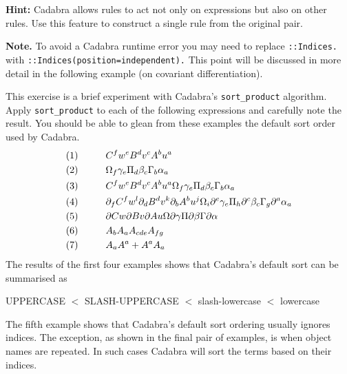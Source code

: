 \documentclass[a4paper,12pt]{article}
\numberwithin{equation}{section}%
\begin{document}
\begin{Exercises}
\begin{Exercise}
      {\bf Hint:} Cadabra allows rules to act not only on expressions but also on other
      rules. Use this feature to construct a single rule from the original pair.

      {\bf Note.} To avoid a Cadabra runtime error you may need to replace \verb|::Indices.|
      with \verb|::Indices(position=independent).| This point will be discussed in more
      detail in the following example (on covariant differentiation).
   \end{Exercise}

   \begin{Exercise}
      This exercise is a brief experiment with Cadabra's \verb|sort_product| algorithm.
      Apply \verb|sort_product| to each of the following expressions and carefully note the
      result. You should be able to glean from these examples the default sort order used by
      Cadabra.
      \begin{align*}
         (1)\hskip 1cm & C^{f} w^{e} B^{d} v^{c} A^{b} u^{a}\\
         (2)\hskip 1cm & \Omega_{f} \gamma_{e} \Pi_{d} \beta_{c} \Gamma_{b} \alpha_{a}\\
         (3)\hskip 1cm & C^{f} w^{e} B^{d} v^{c} A^{b} u^{a} \Omega_{f}
                         \gamma_{e} \Pi_{d} \beta_{c}
                         \Gamma_{b} \alpha_{a}\\
         (4)\hskip 1cm & \partial_{f}{C^{f}} w^{l}
                         \partial_{d}{B^{d}} v^{k} \partial_{b}{A^{b}} u^{j}
                         \Omega_{i} \partial^{e}{\gamma_{e}} \Pi_{h} \partial^{c}{\beta_{c}}
                         \Gamma_{g} \partial^{a}{\alpha_{a}}\\
         (5)\hskip 1cm & \partial{C} w \partial{B} v \partial{A} u \Omega
                         \partial{\gamma} \Pi
                         \partial{\beta} \Gamma \partial{\alpha}\\
         (6)\hskip 1cm & A_{b} A_{a} A_{c d e} A_{f g}\\
         (7)\hskip 1cm & A_{a} A^{a}+A^{a} A_{a}
      \end{align*}
      The results of the first four examples shows that Cadabra's default sort can be
      summarised as
      \begin{center}
         UPPERCASE $<$ SLASH-UPPERCASE $<$ slash-lowercase $<$ lowercase
      \end{center}
      The fifth example shows that Cadabra's default sort ordering usually ignores indices.
      The exception, as shown in the final pair of examples, is when object names are
      repeated. In such cases Cadabra will sort the terms based on their indices.


\end{Exercise}
\end{Exercises}
\end{document}
